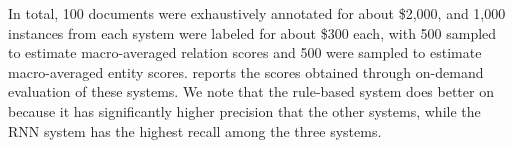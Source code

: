 In total, 100 documents were exhaustively annotated for about \$2,000, and 1,000 instances from each system were labeled for about \$300 each, with 500 sampled to estimate macro-averaged relation scores and 500 were sampled to estimate macro-averaged entity scores.
 reports the scores obtained through on-demand evaluation of these systems.
We note that the rule-based system does better on \fone{} because it has significantly higher precision that the other systems, while the RNN system has the highest recall among the three systems.
